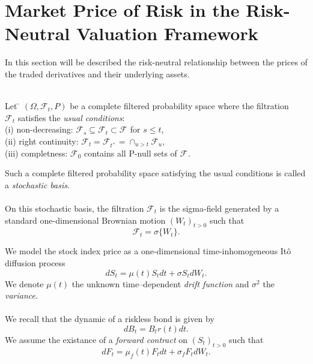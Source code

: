 \documentclass{article}
\theoremstyle{definition}
\newtheorem{definition}[thm]{Definition}
\theoremstyle{remark}
\newcommand{\filtration}[1]{\ensuremath{\mathscr{F}_{#1}}}
\newcommand{\Ito}{It\^{o} }
\newcommand{\process}[1]{\ensuremath{(#1_t)_{t>0}}}
\begin{document}







\newpage
\section{Market Price of Risk in the Risk-Neutral Valuation Framework}\label{sec:riskn}
In this section will be described the risk-neutral relationship between the prices of the traded derivatives and their underlying assets.

\begin{tabbing}\\
Let \= $(\Omega, \filtration{t}, P)$ be a complete filtered probability space where the filtration \\$\filtration{t}$  satisfies the \emph{usual conditions}:\\
\>(i) non-decreasing: $\filtration{s} \subseteq \filtration{t} \subset \filtration{}$ for $s \leq t$,\\
\>(ii) right continuity: $\filtration{t}=\filtration{t^{+}}=\cap_{u>t} \filtration{u}$,\\
\>(iii) completness: \filtration{0} contains all P-null sets of \filtration{}.
\end{tabbing}
Such a complete filtered probability space satisfying the usual conditions is called a \emph{stochastic basis}.\\
\\
On this stochastic basis, the filtration $\filtration{t}$ is the sigma-field generated by a standard one-dimensional Brownian motion \process{W} such that 
\begin{equation*}
\filtration{t}=\sigma\{W_t\}.
\end{equation*}

We model the stock index price as a one-dimensional time-inhomogeneous \Ito diffusion process 
\begin{equation}\label{eq:stockDyn}
dS_t=\mu(t)S_tdt+\sigma S_tdW_t.
\end{equation}
We denote $\mu(t)$ the unknown time--dependent \textit{drift function} and $\sigma^2$ the \emph{variance}.  \\
\\
We recall that the dynamic of a riskless bond is given by 
\begin{equation}\label{eq:bondDyn}
dB_t=B_tr(t)dt.
\end{equation}
We assume the existance of a \emph{forward contract} on \process{S} such that
\begin{equation}
dF_t=\mu_f(t) F_tdt + \sigma_f F_tdW_t. 
\end{equation}
\end{document}
